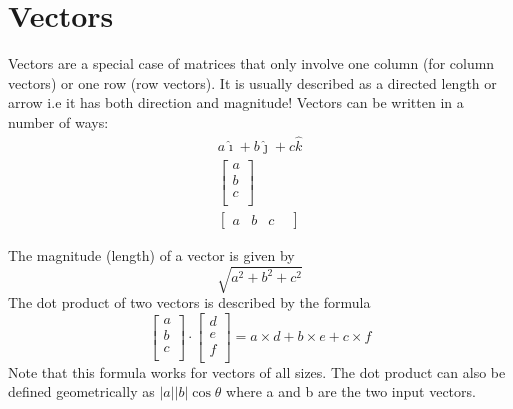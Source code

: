 \documentclass[12pt] {article}
\begin{document}
\section{Vectors}
Vectors are a special case of matrices that only involve one column (for column vectors)
or one row (row vectors). It is usually described as a directed length or arrow i.e 
it has both direction and magnitude! Vectors can be written in a number of ways:
\begin{gather*}
  a\hat{\imath} + b\hat{\jmath} + c\hat{k} \\
  \begin{bmatrix} 
    a \\
    b \\ 
    c \\
  \end{bmatrix} \\
  \begin{bmatrix}
    a &
    b & 
    c &
  \end{bmatrix} 
\end{gather*}

The magnitude (length) of a vector is given by 
\begin{equation*}
  \sqrt{a^2+b^2+c^2}
\end{equation*}
The dot product of two vectors is described by the formula
\begin{equation*}
  \begin{bmatrix}
    a \\
    b \\ 
    c \\
  \end{bmatrix} \cdot
  \begin{bmatrix}
    d \\
    e \\ 
    f \\
  \end{bmatrix}
  = a\times d + b\times e + c \times f 
\end{equation*}
Note that this formula works for vectors of all sizes. The dot product can also be defined 
geometrically as $|a||b|\cos\theta$ where a and b are the two input vectors.
\end{document}
